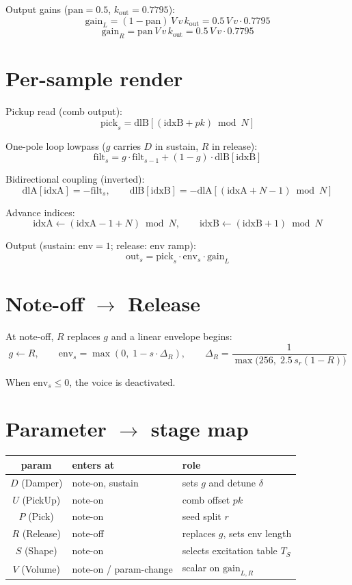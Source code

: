 \documentclass[11pt]{article}
\begin{document}
Output gains ($\text{pan} = 0.5$, $k_{\text{out}} = 0.7795$):
\[
\text{gain}_L = (1-\text{pan})\,V\,v\,k_{\text{out}} = 0.5\,V\,v\cdot 0.7795
\]
\[
\text{gain}_R = \text{pan}\,V\,v\,k_{\text{out}} = 0.5\,V\,v\cdot 0.7795
\]

\section*{Per-sample render}

Pickup read (comb output):
\[
\text{pick}_s = \text{dlB}\!\left[(\text{idxB}+pk)\bmod N\right]
\]

One-pole loop lowpass ($g$ carries $D$ in sustain, $R$ in release):
\[
\text{filt}_s = g\cdot \text{filt}_{s-1} + (1-g)\cdot \text{dlB}[\text{idxB}]
\]

Bidirectional coupling (inverted):
\[
\text{dlA}[\text{idxA}] = -\text{filt}_s,
\qquad
\text{dlB}[\text{idxB}] = -\text{dlA}\!\left[(\text{idxA}+N-1)\bmod N\right]
\]

Advance indices:
\[
\text{idxA} \leftarrow (\text{idxA}-1+N)\bmod N,
\qquad
\text{idxB} \leftarrow (\text{idxB}+1)\bmod N
\]

Output (sustain: $\text{env}=1$; release: $\text{env}$ ramp):
\[
\boxed{\;\text{out}_s = \text{pick}_s \cdot \text{env}_s \cdot \text{gain}_L\;}
\]

\section*{Note-off $\to$ Release}

At note-off, $R$ replaces $g$ and a linear envelope begins:
\[
g \leftarrow R,
\qquad
\text{env}_s = \max\!\left(0,\;1 - s\cdot\Delta_R\right),
\qquad
\Delta_R = \frac{1}{\max\!\bigl(256,\;2.5\,s_r(1-R)\bigr)}
\]

When $\text{env}_s \le 0$, the voice is deactivated.

\section*{Parameter $\to$ stage map}

\begin{center}
\begin{tabular}{c l l}
\toprule
param & enters at & role \\
\midrule
$D$ (Damper) & note-on, sustain & sets $g$ and detune $\delta$ \\
$U$ (PickUp) & note-on & comb offset $pk$ \\
$P$ (Pick) & note-on & seed split $r$ \\
$R$ (Release) & note-off & replaces $g$, sets env length \\
$S$ (Shape) & note-on & selects excitation table $T_S$ \\
$V$ (Volume) & note-on / param-change & scalar on $\text{gain}_{L,R}$ \\
\bottomrule
\end{tabular}
\end{center}
\end{document}
